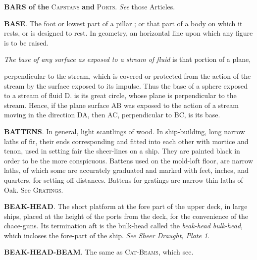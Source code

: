 \textbf{BARS of the} \textsc{Capstans} \textbf{and} \textsc{Ports}. \textit{See} those Articles. 

\textbf{BASE}. The foot or lowest part of a pillar ; or that part of a body on which it rests, or is designed to rest. In geometry, an horizontal line upon which any figure is to be raised. 

\textit{The base of any surface as exposed to a stream of fluid} is that portion of a plane,
\begin{figure}
\begin{center}
\end{center}
\end{figure} 
perpendicular to the stream, which is covered or protected from the action of the stream by the surface exposed to its impulse. Thus the base of a sphere exposed to a stream of fluid D. is its great circle, whose plane is perpendicular to the stream. Hence, if the plane surface AB was exposed to the action of a stream moving in the direction DA, then AC, perpendicular to BC, is its base. 

\textbf{BATTENS}. In general, light scantlings of wood. In ship-building, long narrow laths of fir, their ends corresponding and fitted into each other with mortice and tenon, used in setting fair the sheer-lines on a ship. They are painted black in order to be the more conspicuous. Battens used on the mold-loft floor, are narrow laths, of which some are accurately graduated and marked with feet, inches, and quarters, for setting off distances. Battens for gratings are narrow thin laths of Oak. See \textsc{Gratings}. 

\textbf{BEAK-HEAD}. The short platform at the fore part of the upper deck, in large ships, placed at the height of the ports from the deck, for the convenience of the chace-guns. Its termination aft is the bulk-head called the \textit{beak-head bulk-head}, which incloses the fore-part of the ship. \textit{See Sheer Draught, Plate 1}. 

\textbf{BEAK-HEAD-BEAM}. The same as \textsc{Cat-Beams}, which see.

